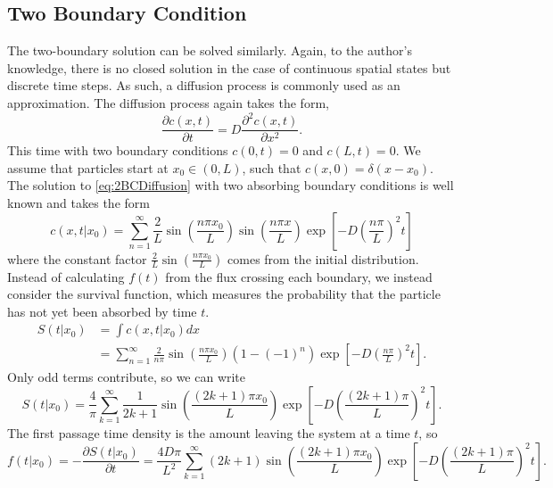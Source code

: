 \subsection{Two Boundary Condition}
The two-boundary solution can be solved similarly. Again, to the author's knowledge, there is no closed solution in the case of continuous spatial states but discrete time steps. As such, a diffusion process is commonly used as an approximation. The diffusion process again takes the form,
\begin{equation}
    \frac{\partial c(x, t)}{\partial t} = D \frac{\partial^2 c(x, t)}{\partial x^2}. \label{eq:2BCDiffusion}
\end{equation}
This time with two boundary conditions $c(0,t)=0$ and $c(L,t)=0$. We assume that particles start at $x_0 \in (0,L)$, such that $c(x, 0)=\delta(x-x_0)$. The solution to \cref{eq:2BCDiffusion} with two absorbing boundary conditions is well known and takes the form
\begin{equation}
    c(x, t| x_0) = \sum_{n=1}^\infty \frac{2}{L} \sin\left( \frac{n \pi x_0}{L} \right) \sin\left( \frac{n \pi x}{L} \right) \exp \left[ -D \left( \frac{n \pi}{L} \right)^2 t\right]
\end{equation}
where the constant factor $\frac{2}{L} \sin\left( \frac{n \pi x_0}{L} \right)$ comes from the initial distribution. Instead of calculating $f(t)$ from the flux crossing each boundary, we instead consider the survival function, which measures the probability that the particle has not yet been absorbed by time $t$.
\begin{align}
    S(t|x_0) &= \int c(x, t| x_0) dx \\
    &= \sum_{n=1}^\infty \frac{2}{n \pi}\sin\left( \frac{n \pi x_0}{L} \right) \left( 1 - (-1)^n\right)\exp \left[ -D \left( \frac{n \pi}{L} \right)^2 t\right].
\end{align}
Only odd terms contribute, so we can write 
\begin{equation}
    S(t|x_0) = \frac{4}{\pi} \sum_{k=1}^\infty \frac{1}{2k+1} \sin\left( \frac{(2k+1) \pi x_0}{L} \right)\exp \left[ -D \left( \frac{(2k+1) \pi}{L} \right)^2 t\right].
\end{equation}
The first passage time density is the amount leaving the system at a time $t$, so
\begin{equation}
    f(t|x_0) = -\frac{\partial S(t|x_0)}{\partial t} = \frac{4D\pi}{L^2} \sum_{k=1}^\infty (2k+1) \sin\left( \frac{(2k+1) \pi x_0}{L} \right)\exp \left[ -D \left( \frac{(2k+1) \pi}{L} \right)^2 t\right].
\end{equation}

